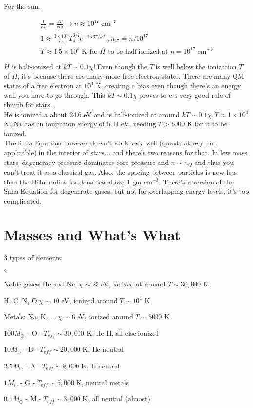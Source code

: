 \documentclass[10pt,letterpaper,final]{book}
\newcommand{\ra}{\rightarrow}
\begin{document}
For the sun,

\begin{align}
\frac{1}{\kappa \rho} = \frac{kT}{mg} \ra n\approx 10^{12} \text{ cm}^{-3}\\
1 \approx \frac{3 \times 10^4}{n_{17}}T_4^{3/2} e^{-15.77 /kT}~,n_{17} = n/10^{17}\\
T \approx 1.5 \times 10^4 \text{ K for $H$ to be half-ionized at $n = 10^{17}$ cm$^{-3}$}
\end{align}

$H$ is half-ionized at $kT \sim 0.1 \chi$! Even though the $T$ is well below the ionization $T$ of $H$, it's because there are many more free electron states. There are many QM states of a free electron at $10^4$ K, creating a bias even though there's an energy wall you have to go through. This  $kT \sim 0.1 \chi$ proves to e a very good rule of thumb for stars. \\

He is ionized a about 24.6 eV and is half-ionized at around $kT \sim 0.1 \chi, T \approx 1 \times 10^4$ K. Na has an ionization energy of 5.14 eV, needing $T > 6000$ K for it to be ionized. \\

The Saha Equation however doesn't work very well (quantitatively not applicable) in the interior of stars... and there's two reasons for that. In low mass stars, degeneracy pressure dominates core pressure and $n \sim n_Q$ and thus you can't treat it as a classical gas. Also, the spacing between particles is now less than the B\"ohr radius for densities above 1 gm cm$^{-3}$. There's a version of the Saha Equation for degenerate gases, but not for overlapping energy levels, it's too complicated.

\section{Masses and What's What }

3 types of elements:
\begin{list}{$\circ$}{}
\item Noble gases: He and Ne, $\chi \sim 25$ eV, ionized at around $T \sim 30,000$ K
\item H, C, N, O $\chi \sim 10$ eV, ionized around $T \sim 10^4$ K
\item Metals: Na, K, ... $\chi \sim 6$ eV, ionized around $T \sim 5000$ K
\item $100M_\odot$ - O - $T_{eff} \sim 30,000$ K, He II, all else ionized
\item $10M_\odot$ - B - $T_{eff} \sim 20,000$ K, He neutral
\item $2.5 M_\odot$ - A - $ T_{eff} \sim 9,000$ K, H neutral
\item $1M_\odot$ - G - $T_{eff} \sim 6,000$ K, neutral metals
\item $0.1M_\odot$  - M - $T_{eff} \sim 3,000$ K, all neutral (almost)
\end{list} 
\end{document}
